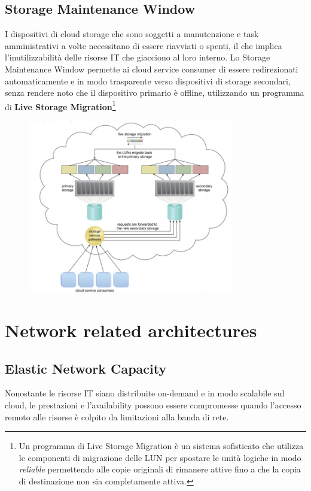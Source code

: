 \subsection{Storage Maintenance Window}
I dispositivi di cloud storage che sono soggetti a manutenzione e task amministrativi a volte necessitano di essere riavviati o spenti, il che implica l'inutilizzabilità delle risorse IT che giacciono al loro interno. Lo Storage Maintenance Window permette ai cloud service consumer di essere redirezionati automaticamente e in modo trasparente verso dispositivi di storage secondari, senza rendere noto che il dispositivo primario è offline, utilizzando un programma di \textbf{Live Storage Migration}\footnote{Un programma di Live Storage Migration è un sistema sofisticato che utilizza le componenti di migrazione delle LUN per spostare le unità logiche in modo \textit{reliable} permettendo alle copie originali di rimanere attive fino a che la copia di destinazione non sia completamente attiva.}

\begin{figure}[htb!]
    \centering
    \includegraphics[width=9cm]{./Images/cap13/13.6.png}
\end{figure}

\section{Network related architectures}
\subsection{Elastic Network Capacity}
Nonostante le risorse IT siano distribuite on-demand e in modo scalabile sul cloud, le prestazioni e l'availability possono essere compromesse quando l'accesso remoto alle risorse è colpito da limitazioni alla banda di rete.

